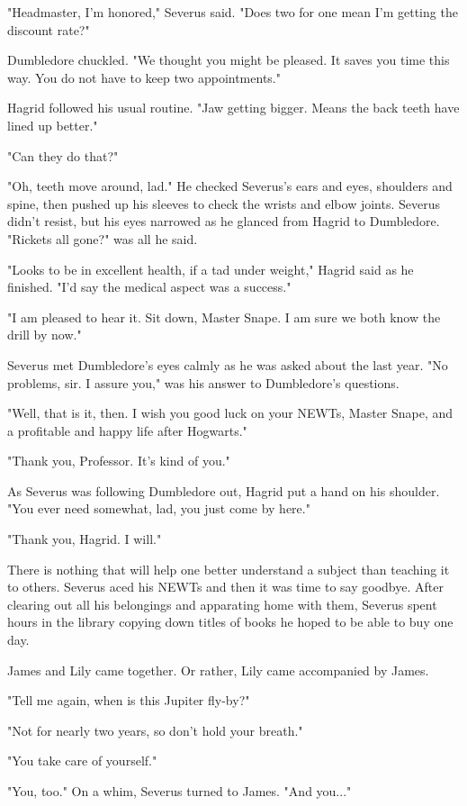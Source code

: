 "Headmaster, I'm honored," Severus said. "Does two for one mean I'm getting the discount rate?"

Dumbledore chuckled. "We thought you might be pleased. It saves you time this way. You do not have to keep two appointments."

Hagrid followed his usual routine. "Jaw getting bigger. Means the back teeth have lined up better."

"Can they do that?"

"Oh, teeth move around, lad." He checked Severus's ears and eyes, shoulders and spine, then pushed up his sleeves to check the wrists and elbow joints. Severus didn't resist, but his eyes narrowed as he glanced from Hagrid to Dumbledore. "Rickets all gone?" was all he said.

"Looks to be in excellent health, if a tad under weight," Hagrid said as he finished. "I'd say the medical aspect was a success."

"I am pleased to hear it. Sit down, Master Snape. I am sure we both know the drill by now."

Severus met Dumbledore's eyes calmly as he was asked about the last year. "No problems, sir. I assure you," was his answer to Dumbledore's questions.

"Well, that is it, then. I wish you good luck on your NEWTs, Master Snape, and a profitable and happy life after Hogwarts."

"Thank you, Professor. It's kind of you."

As Severus was following Dumbledore out, Hagrid put a hand on his shoulder. "You ever need somewhat, lad, you just come by here."

"Thank you, Hagrid. I will."

There is nothing that will help one better understand a subject than teaching it to others. Severus aced his NEWTs and then it was time to say goodbye. After clearing out all his belongings and apparating home with them, Severus spent hours in the library copying down titles of books he hoped to be able to buy one day.

James and Lily came together. Or rather, Lily came accompanied by James.

"Tell me again, when is this Jupiter fly-by?"

"Not for nearly two years, so don't hold your breath."

"You take care of yourself."

"You, too." On a whim, Severus turned to James. "And you..."

